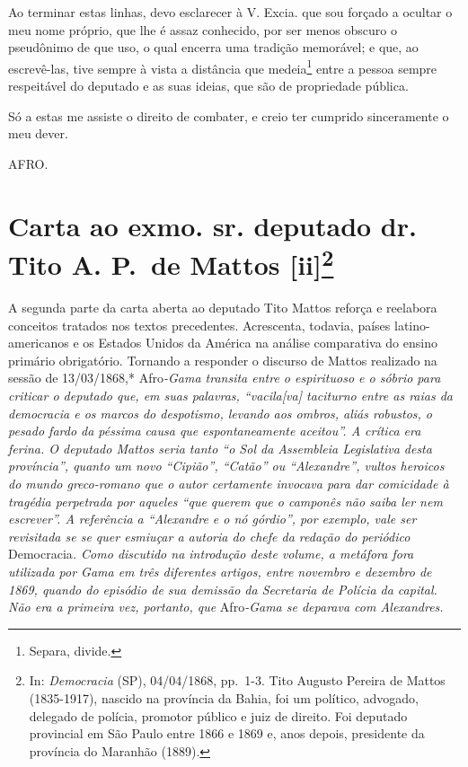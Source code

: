 Ao terminar estas linhas, devo esclarecer à V. Excia. que sou forçado a
ocultar o meu nome próprio, que lhe é assaz conhecido, por ser menos
obscuro o pseudônimo de que uso, o qual encerra uma tradição memorável;
e que, ao escrevê-las, tive sempre à vista a distância que
medeia\footnote{Separa, divide.} entre a pessoa sempre respeitável do
deputado e as suas ideias, que são de propriedade pública.

Só a estas me assiste o direito de combater, e creio ter cumprido
sinceramente o meu dever.

AFRO.

\chapter{Carta ao exmo. sr. deputado dr. Tito A. P.~de Mattos
{[}ii{]}\footnote{In: \emph{Democracia} (SP), 04/04/1868, pp.~1-3.
  Tito Augusto Pereira de Mattos (1835-1917), nascido na província da
  Bahia, foi um político, advogado, delegado de polícia, promotor
  público e juiz de direito. Foi deputado provincial em São Paulo entre
  1866 e 1869 e, anos depois, presidente da província do Maranhão
  (1889).}}

\begin{didascalia}
A segunda parte da carta aberta ao deputado Tito Mattos reforça e
reelabora conceitos tratados nos textos precedentes. Acrescenta,
todavia, países latino-americanos e os Estados Unidos da América na
análise comparativa do ensino primário obrigatório. Tornando a responder
o discurso de Mattos realizado na sessão de 13/03/1868,* Afro\emph{-Gama
transita entre o espirituoso e o sóbrio para criticar o deputado que, em
suas palavras, ``vacila{[}va{]} taciturno entre as raias da democracia e
os marcos do despotismo, levando aos ombros, aliás robustos, o pesado
fardo da péssima causa que espontaneamente aceitou''. A crítica era
ferina. O deputado Mattos seria tanto ``o Sol da Assembleia Legislativa
desta província'', quanto um novo ``Cipião'', ``Catão'' ou ``Alexandre'',
vultos heroicos do mundo greco-romano que o autor certamente invocava
para dar comicidade à tragédia perpetrada por aqueles ``que querem que o
camponês não saiba ler nem escrever''. A referência a ``Alexandre e o nó
górdio'', por exemplo, vale ser revisitada se se quer esmiuçar a autoria
do chefe da redação do periódico} Democracia\emph{. Como discutido na
introdução deste volume, a metáfora fora utilizada por Gama em três
diferentes artigos, entre novembro e dezembro de 1869, quando do
episódio de sua demissão da Secretaria de Polícia da capital. Não era a
primeira vez, portanto, que} Afro\emph{-Gama se deparava com
Alexandres.}
\end{didascalia}

